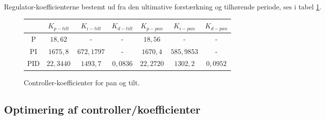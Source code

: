 Regulator-koefficienterne bestemt ud fra den ultimative forstærkning og tilhørende periode, ses i tabel \ref{tb:ZieglerNichols1}.

\begin{figure}[th!]
\centering
\begin{tabular}{c|c|c|c|c|c|c}
&\(K_{p-tilt}\) & \(K_{i-tilt}\) & \(K_{d-tilt}\)&\(K_{p-pan}\) & \(K_{i-pan}\) & \(K_{d-pan}\)\\\hline
P&\(18,62\) &-&-&\(18,56\)&-&-\\
PI&\(1675,8\) & \( 672,1797\) &-&\(1670,4\) & \( 585,9853  \) &-\\
PID&\(22,3440 \) &  \( 1493,7 \) & \(0,0836  \)&\(22,2720 \) &  \( 1302,2 \) & \(0,0952  \)
\end{tabular}
\captionsetup{type=table}
\caption[Controller-koefficienter, Ziegler-Nichols Tuning Methode]{Controller-koefficienter for pan og tilt.}\label{tb:ZieglerNichols1}
\end{figure}



\subsection{Optimering af controller/koefficienter}
